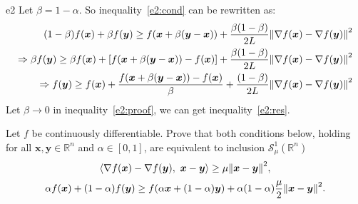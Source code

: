 \documentclass{article}
\newcommand{\R}{\mathbb{R}}
\newcommand{\xB}{\bm{x}}
\renewcommand{\grad}{\nabla}
\newcommand{\yB}{\bm{y}}
\newcommand{\SM}{\mathcal{S}}
\newcommand{\strongconvextype}[2]{\SM_{#1}^{#2}(\R^n)}
\begin{document}
\begin{PROOF}{e2}
    Let \(\beta = 1- \alpha\). So inequality~\ref{e2:cond} can be rewritten as:
    \begin{equation}\label{e2:proof}
        \begin{aligned}
            (1 - \beta) f(\xB) + \beta f(\yB) \ge f(\xB + \beta (\yB - \xB)) + \frac{\beta(1-\beta)}{2L} \norm{\grad f(\xB) - \grad f(\yB)}^2 \\
            \Rightarrow \beta f(\yB) \ge \beta f(\xB) + [f(\xB + \beta (\yB - \xB)) - f(\xB)] + \frac{\beta(1-\beta)}{2L} \norm{\grad f(\xB) - \grad f(\yB)}^2 \\
            \Rightarrow f(\yB) \ge f(\xB) + \frac{f(\xB + \beta (\yB - \xB)) - f(\xB)}{\beta} + \frac{(1-\beta)}{2L} \norm{\grad f(\xB) - \grad f(\yB)}^2 \\
        \end{aligned}
    \end{equation}
    Let \(\beta \to 0\) in inequality~\ref{e2:proof}, we can get inequality~\ref{e2:res}.
\end{PROOF}

\begin{excercise}\label{e3}
Let $f$ be continuously differentiable. Prove that both conditions below, holding for all $\xB, \yB \in \R^n$  and $\alpha \in [0,1]$, are equivalent to inclusion $\strongconvextype{\mu}{1}$
    \begin{equation}\label{e3:cond1}
        \innerprod{\grad f(\xB) - \grad f(\yB)}{\xB - \yB} \geq \mu \norm{\xB - \yB}^2,
    \end{equation}
    \begin{equation}\label{e3:cond2}
        \alpha f(\xB) + (1-\alpha) f(\yB) \geq f(\alpha \xB + (1-\alpha) \yB ) + \alpha (1-\alpha) \frac{\mu}{2} \norm{\xB - \yB}^2.
    \end{equation}
\end{excercise}
\end{document}
